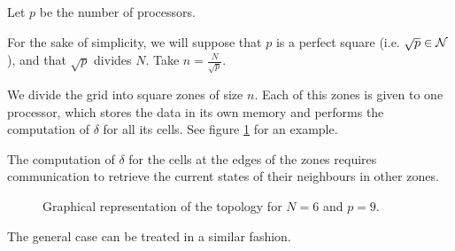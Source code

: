 
\begin{question}

Let $p$ be the number of processors.

For the sake of simplicity, we will suppose that $p$ is a perfect square (i.e. $\sqrt p \in \mathcal{N}$), and that $\sqrt p$ divides $N$. Take $n = \frac{N}{\sqrt p}$.

We divide the grid into square zones of size $n$. Each of this zones is given to one processor, which stores the data in its own memory and performs the computation of $\delta$ for all its cells. See figure \ref{q2:draw} for an example.

The computation of $\delta$ for the cells at the edges of the zones requires communication to retrieve the current states of their neighbours in other zones.


\begin{figure}
\caption{Graphical representation of the topology for $N=6$ and $p=9$.}
\label{q2:draw}
\begin{center}
\end{center}
\end{figure}


The general case can be treated in a similar fashion.

\end{question}






